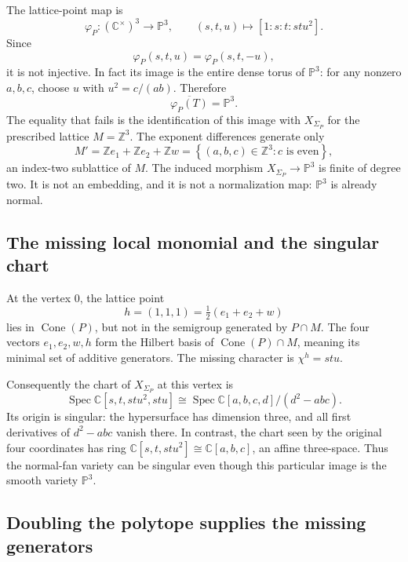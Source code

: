 \documentclass[11pt]{article}
\theoremstyle{definition}
\theoremstyle{remark}
\DeclareMathOperator{\Spec}{Spec}
\DeclareMathOperator{\Cone}{Cone}
\newcommand{\set}[1]{\left\{#1\right\}}
\newcommand{\bP}{\mathbb{P}}
\newcommand{\bZ}{\mathbb{Z}}
\newcommand{\bC}{\mathbb{C}}
\newcommand{\vf}{\varphi}
\newcommand{\isom}{\cong}
\begin{document}
The lattice-point map is
    \[
    \vf_P:(\bC^\times)^3\longrightarrow\bP^3,\qquad
    (s,t,u)\longmapsto[1:s:t:stu^2].
\]
Since
\[
    \vf_P(s,t,u)=\vf_P(s,t,-u),
\]
it is not injective. In fact its image is the entire dense torus of
\(\bP^3\): for any nonzero \(a,b,c\), choose \(u\) with
\(u^2=c/(ab)\). Therefore
\[
    \boxed{\overline{\vf_P(T)}=\bP^3.}
\]
The equality that fails is the identification of this image with
\(X_{\Sigma_P}\) for the prescribed lattice \(M=\bZ^3\).
The exponent differences generate only
\[
    M'=\bZ e_1+\bZ e_2+\bZ w
       =\set{(a,b,c)\in\bZ^3:c\text{ is even}},
\]
an index-two sublattice of \(M\). The induced morphism
\(X_{\Sigma_P}\to\bP^3\) is finite of degree two. It is not an
embedding, and it is not a normalization map: \(\bP^3\) is already
normal.

\subsection{The missing local monomial and the singular chart}

At the vertex \(0\), the lattice point
\[
    h=(1,1,1)=\tfrac12(e_1+e_2+w)
\]
lies in \(\Cone(P)\), but not in the semigroup generated by
\(P\cap M\). The four vectors \(e_1,e_2,w,h\) form the Hilbert basis
of \(\Cone(P)\cap M\), meaning its minimal set of additive generators.
The missing character is \(\chi^h=stu\).

Consequently the chart of \(X_{\Sigma_P}\) at this vertex is
\[
    \Spec\bC[s,t,stu^2,stu]
      \isom\Spec\bC[a,b,c,d]/(d^2-abc).
\]
Its origin is singular: the hypersurface has dimension three, and
all first derivatives of \(d^2-abc\) vanish there. In contrast, the
chart seen by the original four coordinates has ring
\(\bC[s,t,stu^2]\isom\bC[a,b,c]\), an affine three-space.
Thus the normal-fan variety can be singular even though this
particular image is the smooth variety \(\bP^3\).

\subsection{Doubling the polytope supplies the missing generators}
\end{document}
